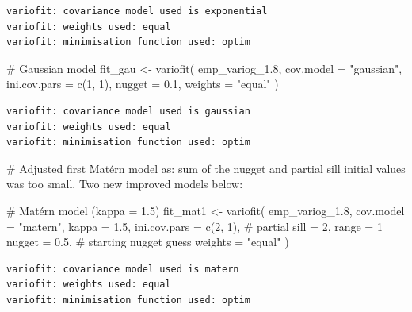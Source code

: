\documentclass[
  11pt,
]{article}
\newenvironment{Shaded}{\begin{snugshade}}{\end{snugshade}}
\newcommand{\AttributeTok}[1]{\textcolor[rgb]{0.40,0.45,0.13}{#1}}
\newcommand{\CommentTok}[1]{\textcolor[rgb]{0.37,0.37,0.37}{#1}}
\newcommand{\DecValTok}[1]{\textcolor[rgb]{0.68,0.00,0.00}{#1}}
\newcommand{\FloatTok}[1]{\textcolor[rgb]{0.68,0.00,0.00}{#1}}
\newcommand{\FunctionTok}[1]{\textcolor[rgb]{0.28,0.35,0.67}{#1}}
\newcommand{\NormalTok}[1]{\textcolor[rgb]{0.00,0.23,0.31}{#1}}
\newcommand{\OtherTok}[1]{\textcolor[rgb]{0.00,0.23,0.31}{#1}}
\newcommand{\StringTok}[1]{\textcolor[rgb]{0.13,0.47,0.30}{#1}}
\begin{document}
\begin{verbatim}
variofit: covariance model used is exponential 
variofit: weights used: equal 
variofit: minimisation function used: optim 
\end{verbatim}

\begin{Shaded}
\begin{Highlighting}[]
\CommentTok{\# Gaussian model}
\NormalTok{fit\_gau }\OtherTok{\textless{}{-}} \FunctionTok{variofit}\NormalTok{(}
\NormalTok{  emp\_variog\_1}\FloatTok{.8}\NormalTok{,}
  \AttributeTok{cov.model =} \StringTok{"gaussian"}\NormalTok{,}
  \AttributeTok{ini.cov.pars =} \FunctionTok{c}\NormalTok{(}\DecValTok{1}\NormalTok{, }\DecValTok{1}\NormalTok{),}
  \AttributeTok{nugget =} \FloatTok{0.1}\NormalTok{,}
  \AttributeTok{weights =} \StringTok{"equal"}
\NormalTok{)}
\end{Highlighting}
\end{Shaded}

\begin{verbatim}
variofit: covariance model used is gaussian 
variofit: weights used: equal 
variofit: minimisation function used: optim 
\end{verbatim}

\begin{Shaded}
\begin{Highlighting}[]
\CommentTok{\# Adjusted first Matérn model as: sum of the nugget and partial sill initial values was too small. Two new improved models below:}

\CommentTok{\# Matérn model (kappa = 1.5)}
\NormalTok{fit\_mat1 }\OtherTok{\textless{}{-}} \FunctionTok{variofit}\NormalTok{(}
\NormalTok{  emp\_variog\_1}\FloatTok{.8}\NormalTok{,}
  \AttributeTok{cov.model =} \StringTok{"matern"}\NormalTok{,}
  \AttributeTok{kappa =} \FloatTok{1.5}\NormalTok{,}
  \AttributeTok{ini.cov.pars =} \FunctionTok{c}\NormalTok{(}\DecValTok{2}\NormalTok{, }\DecValTok{1}\NormalTok{),   }\CommentTok{\# partial sill = 2, range = 1}
  \AttributeTok{nugget =} \FloatTok{0.5}\NormalTok{,             }\CommentTok{\# starting nugget guess}
  \AttributeTok{weights =} \StringTok{"equal"}
\NormalTok{)}
\end{Highlighting}
\end{Shaded}

\begin{verbatim}
variofit: covariance model used is matern 
variofit: weights used: equal 
variofit: minimisation function used: optim 
\end{verbatim}
\end{document}
